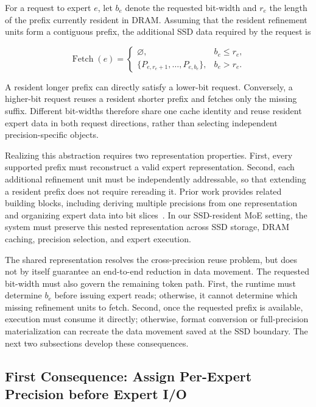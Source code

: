 \documentclass[sigconf, nonacm]{acmart}
\begin{document}
For a request to expert \(e\), let \(b_e\) denote the requested
bit-width and \(r_e\) the length of the prefix currently resident in
DRAM. Assuming that the resident refinement units form a contiguous
prefix, the additional SSD data required by the request is

\begin{equation}
    \operatorname{Fetch}(e) =
    \begin{cases}
        \varnothing,
        & b_e \leq r_e, \\[2pt]
        \{P_{e,r_e+1},\ldots,P_{e,b_e}\},
        & b_e > r_e.
    \end{cases}
\end{equation}

A resident longer prefix can directly satisfy a lower-bit request.
Conversely, a higher-bit request reuses a resident shorter prefix and
fetches only the missing suffix. Different bit-widths therefore share
one cache identity and reuse resident expert data in both request
directions, rather than selecting independent precision-specific
objects.

Realizing this abstraction requires two representation properties.
First, every supported prefix must reconstruct a valid expert
representation. Second, each additional refinement unit must be
independently addressable, so that extending a resident prefix does not
require rereading it. Prior work provides related building blocks,
including deriving multiple precisions from one representation and
organizing expert data into bit slices~\cite{park2024anyprecision,nair2025matquant}. In our SSD-resident
MoE setting, the system must preserve this nested representation across
SSD storage, DRAM caching, precision selection, and expert execution.

The shared representation resolves the cross-precision reuse problem,
but does not by itself guarantee an end-to-end reduction in data
movement. The requested bit-width must also govern the remaining token
path. First, the runtime must determine \(b_e\) before issuing expert
reads; otherwise, it cannot determine which missing refinement units
to fetch. Second, once the requested prefix is available, execution
must consume it directly; otherwise, format conversion or
full-precision materialization can recreate the data movement saved at
the SSD boundary. The next two subsections develop these consequences.

\subsection{First Consequence:
Assign Per-Expert Precision before Expert I/O}
\label{sec:challenge-preio}
\end{document}
